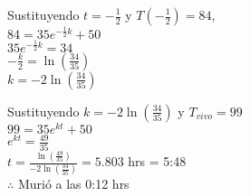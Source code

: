 \begin{center}
Sustituyendo $t = -\frac{1}{2}$ y $T(-\frac{1}{2}) = 84$,\\
\vspace{8pt}
$84 = 35e^{-\frac{1}{2}k} + 50$\\
\vspace{8pt}
$35e^{-\frac{1}{2}k} = 34$\\
\vspace{8pt}
$-\frac{k}{2} = \ln{(\frac{34}{35})}$\\ 
\vspace{8pt}
$k = -2\ln{(\frac{34}{35})}$\\ 
\vspace{12pt}

Sustituyendo $k = -2\ln{(\frac{34}{35})}$ y $T_{vivo} = 99$\\
\vspace{8pt}
$99 = 35e^{kt} + 50$\\ 
\vspace{8pt}
$e^{kt} = \frac{49}{35}$\\ 
\vspace{8pt}
$t = \frac{\ln{(\frac{49}{35})}}{-2\ln{(\frac{34}{35})}} = 5.803$ hrs = 5:48\\ 
\vspace{8pt}
$\therefore$ Murió a las 0:12 hrs
\end{center}
